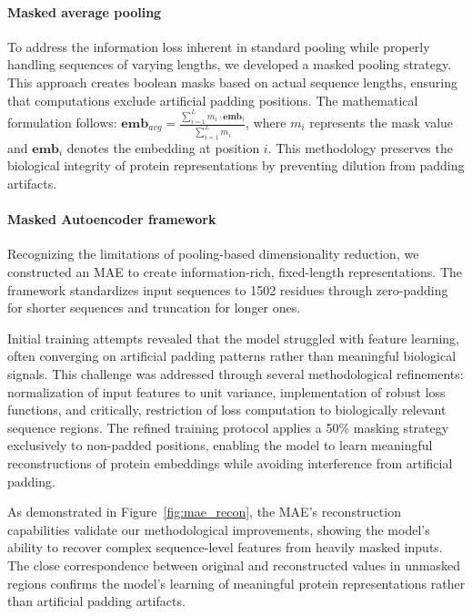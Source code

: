 \documentclass{article}
\begin{document}
	\paragraph{Masked average pooling} To address the information loss inherent in standard pooling while properly handling sequences of varying lengths, we developed a masked pooling strategy. This approach creates boolean masks based on actual sequence lengths, ensuring that computations exclude artificial padding positions. The mathematical formulation follows: $\mathbf{emb}_{avg} = \frac{\sum_{i=1}^{L} m_i \cdot \mathbf{emb}_i}{\sum_{i=1}^{L} m_i}$, where $m_i$ represents the mask value and $\mathbf{emb}_i$ denotes the embedding at position $i$. This methodology preserves the biological integrity of protein representations by preventing dilution from padding artifacts.

	\paragraph{Masked Autoencoder framework} Recognizing the limitations of pooling-based dimensionality reduction, we constructed an MAE to create information-rich, fixed-length representations. The framework standardizes input sequences to 1502 residues through zero-padding for shorter sequences and truncation for longer ones. 
	
	Initial training attempts revealed that the model struggled with feature learning, often converging on artificial padding patterns rather than meaningful biological signals. This challenge was addressed through several methodological refinements: normalization of input features to unit variance, implementation of robust loss functions, and critically, restriction of loss computation to biologically relevant sequence regions. The refined training protocol applies a 50\% masking strategy exclusively to non-padded positions, enabling the model to learn meaningful reconstructions of protein embeddings while avoiding interference from artificial padding.

	As demonstrated in Figure~\ref{fig:mae_recon}, the MAE's reconstruction capabilities validate our methodological improvements, showing the model's ability to recover complex sequence-level features from heavily masked inputs. The close correspondence between original and reconstructed values in unmasked regions confirms the model's learning of meaningful protein representations rather than artificial padding artifacts.
	
\end{document}
